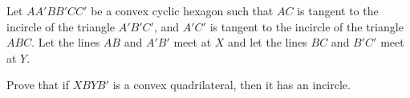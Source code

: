 Let $AA'BB'CC'$ be a convex cyclic hexagon such that $AC$ is tangent to the incircle of the triangle $A'B'C'$, and $A'C'$ is tangent to the incircle of the triangle $ABC$. Let the lines $AB$ and $A'B'$ meet at $X$ and let the lines $BC$ and $B'C'$ meet at $Y$.

Prove that if $XBYB'$ is a convex quadrilateral, then it has an incircle.
